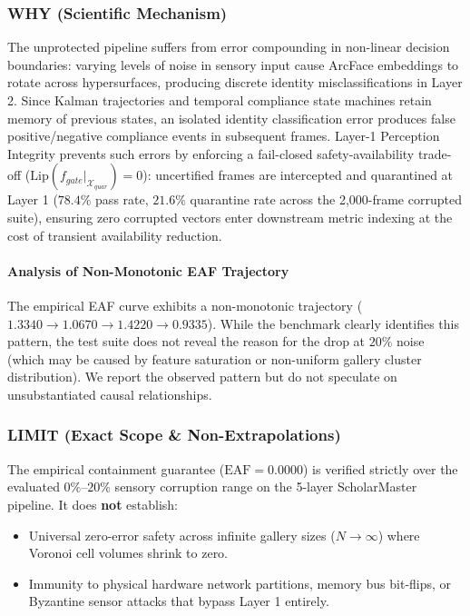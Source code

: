 \documentclass[conference]{IEEEtran}
\begin{document}
\subsubsection{WHY (Scientific Mechanism)}
The unprotected pipeline suffers from error compounding in non-linear decision boundaries: varying levels of noise in sensory input cause ArcFace embeddings to rotate across hypersurfaces, producing discrete identity misclassifications in Layer 2. Since Kalman trajectories and temporal compliance state machines retain memory of previous states, an isolated identity classification error produces false positive/negative compliance events in subsequent frames. Layer-1 Perception Integrity prevents such errors by enforcing a fail-closed safety-availability trade-off ($\mathrm{Lip}(f_{gate}|_{\mathcal{X}_{quar}}) = 0$): uncertified frames are intercepted and quarantined at Layer 1 ($78.4\%$ pass rate, $21.6\%$ quarantine rate across the 2,000-frame corrupted suite), ensuring zero corrupted vectors enter downstream metric indexing at the cost of transient availability reduction.

\paragraph{Analysis of Non-Monotonic EAF Trajectory} The empirical EAF curve exhibits a non-monotonic trajectory ($1.3340 \to 1.0670 \to 1.4220 \to 0.9335$). While the benchmark clearly identifies this pattern, the test suite does not reveal the reason for the drop at $20\%$ noise (which may be caused by feature saturation or non-uniform gallery cluster distribution). We report the observed pattern but do not speculate on unsubstantiated causal relationships.

\subsubsection{LIMIT (Exact Scope \& Non-Extrapolations)}
The empirical containment guarantee ($\text{EAF} = 0.0000$) is verified strictly over the evaluated $0\%\text{--}20\%$ sensory corruption range on the 5-layer ScholarMaster pipeline. It does \textbf{not} establish:
\begin{itemize}
    \item Universal zero-error safety across infinite gallery sizes ($N \to \infty$) where Voronoi cell volumes shrink to zero.
    \item Immunity to physical hardware network partitions, memory bus bit-flips, or Byzantine sensor attacks that bypass Layer 1 entirely.
\end{itemize}
\end{document}
